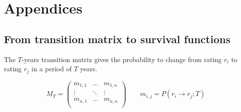 \documentclass[a4paper,12pt,final]{article}
\begin{document}

\newpage
\appendix
\section{Appendices}

\subsection{From transition matrix to survival functions}
\label{ap:tmatrix}
The $T$-years transition matrix gives the probability to change from rating $r_i$ 
to rating $r_j$ in a period of $T$ years.

\begin{displaymath}
M_T = \left(
\begin{array}{ccc}
m_{1,1} & \dots  & m_{1,n} \\
\vdots & \ddots & \vdots   \\
m_{n,1} & \dots  & m_{n,n} \\
\end{array}
\right)
\qquad
m_{i,j} = P(r_i \to r_j;T)
\end{displaymath}
\end{document}
